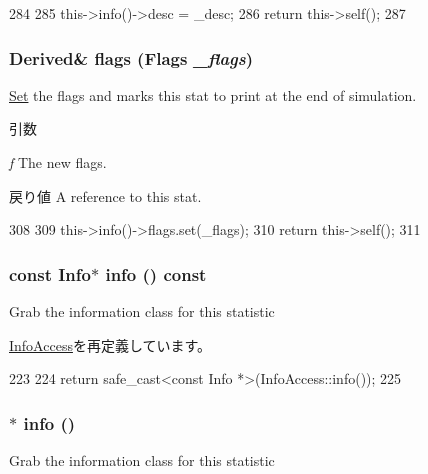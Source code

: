 \begin{DoxyCode}
284     {
285         this->info()->desc = _desc;
286         return this->self();
287     }
\end{DoxyCode}
\hypertarget{classStats_1_1DataWrap_a44a5f223105dda0be0ebda809eef5d3d}{
\subsubsection[{flags}]{\setlength{\rightskip}{0pt plus 5cm}Derived\& flags ({\bf Flags} {\em \_\-flags})}}
\label{classStats_1_1DataWrap_a44a5f223105dda0be0ebda809eef5d3d}
\hyperlink{classSet}{Set} the flags and marks this stat to print at the end of simulation. 
\begin{DoxyParams}{引数}
\item[{\em f}]The new flags. \end{DoxyParams}
\begin{DoxyReturn}{戻り値}
A reference to this stat. 
\end{DoxyReturn}



\begin{DoxyCode}
308     {
309         this->info()->flags.set(_flags);
310         return this->self();
311     }
\end{DoxyCode}
\hypertarget{classStats_1_1DataWrap_a69ddecf05fa28115a433af3080071d37}{
\subsubsection[{info}]{\setlength{\rightskip}{0pt plus 5cm}const {\bf Info}$\ast$ info () const}}
\label{classStats_1_1DataWrap_a69ddecf05fa28115a433af3080071d37}
Grab the information class for this statistic 

\hyperlink{classStats_1_1InfoAccess_add4438b5956a40b37420bc32c40ef50a}{InfoAccess}を再定義しています。


\begin{DoxyCode}
223     {
224         return safe_cast<const Info *>(InfoAccess::info());
225     }
\end{DoxyCode}
\hypertarget{classStats_1_1DataWrap_aec129e6dc6d561f923a46dd5fa3a1908}{
\subsubsection[{info}]{$\ast$ info ()}}
\label{classStats_1_1DataWrap_aec129e6dc6d561f923a46dd5fa3a1908}
Grab the information class for this statistic 

